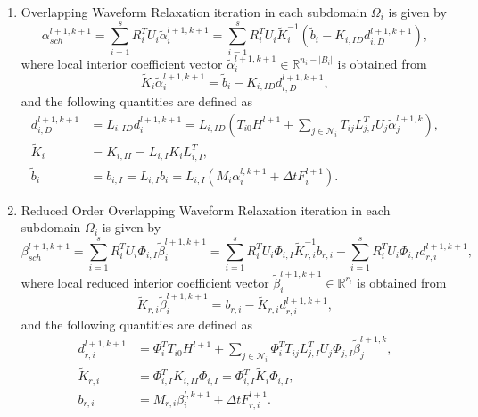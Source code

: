 \documentclass[a4paper, 11pt]{article}
\theoremstyle{plain}
\theoremstyle{definition}
\theoremstyle{remark}
\begin{document}
\begin{enumerate}
    \item Overlapping Waveform Relaxation iteration in each subdomain $\Omega_i$ is given by
    \begin{equation*}
        \alpha_{sch}^{l+1, k+1} = \sum_{i = 1}^{s}R_{i}^{T}U_{i}\tilde{\alpha}^{l+1, k + 1}_{i} = \sum_{i = 1}^{s}R_{i}^{T}U_{i}\tilde{K}_{i}^{-1}\left(\tilde{b}_{i} - K_{i, ID}d^{l+1, k+1}_{i, D}\right),
    \end{equation*}
    where local interior coefficient vector $\tilde{\alpha}_{i}^{l+1, k+1}\in \mathbb{R}^{n_{i} - \lvert B_{i}\rvert}$ is obtained from
    \begin{equation*}
        \tilde{K}_{i}\tilde{\alpha}_{i}^{l+1, k+1} = \tilde{b}_{i} - K_{i, ID}d^{l+1, k+1}_{i, D},
    \end{equation*}
    and the following quantities are defined as
    \begin{align*}
        d^{l+1, k+1}_{i, D} &= L_{i, ID}d_{i}^{l+1, k+1} = L_{i, ID}\left(T_{i0}H^{l+1} + \sum_{j\in\mathcal{N}_{i}}T_{ij}L_{j, I}^{T}U_{j}\tilde{\alpha}^{l+1, k}_{j}\right),\\
        \tilde{K}_{i} &= K_{i, II} = L_{i, I}K_{i}L_{i, I}^{T},\\
        \tilde{b}_{i} &= b_{i, I} = L_{i, I}b_{i} = L_{i, I}\left(M_{i} \alpha_{i}^{l, k+1} + \Delta tF_{i}^{l+1}\right).
    \end{align*}
    \item Reduced Order Overlapping Waveform Relaxation iteration in each subdomain $\Omega_i$ is given by
    \begin{equation*}
        \beta_{sch}^{l+1, k+1} = \sum_{i = 1}^{s}R_{i}^{T}U_{i}\Phi_{i, I}\tilde{\beta}^{l+1, k+1}_{i} = \sum_{i = 1}^{s}R_{i}^{T}U_{i}\Phi_{i, I}\tilde{K}_{r, i}^{-1}b_{r, i} - \sum_{i = 1}^{s}R_{i}^{T}U_{i}\Phi_{i, I}d^{l+1, k+1}_{r, i},
    \end{equation*}
    where local reduced interior coefficient vector $\tilde{\beta}_{i}^{l+1, k+1}\in \mathbb{R}^{r_{i}}$ is obtained from
    \begin{equation*}
        \tilde{K}_{r, i}\tilde{\beta}_{i}^{l+1, k+1} = b_{r, i} - \tilde{K}_{r, i}d^{l+1, k+1}_{r, i},
    \end{equation*}
    and the following quantities are defined as
    \begin{align*}
        d^{l+1, k+1}_{r, i} &= \Phi_{i}^{T}T_{i0}H^{l+1} + \sum_{j\in\mathcal{N}_{i}}\Phi_{i}^{T}T_{ij}L_{j, I}^{T}U_{j}\Phi_{j, I}\tilde{\beta}^{l+1, k}_{j},\\
        \tilde{K}_{r, i} &= \Phi_{i, I}^{T}K_{i, II}\Phi_{i, I} = \Phi_{i, I}^{T}\tilde{K}_{i}\Phi_{i, I},\\
        b_{r, i} &= M_{r, i} \beta_{i}^{l, k+1} + \Delta tF_{r, i}^{l+1}.
    \end{align*}
\end{enumerate}
\end{document}
